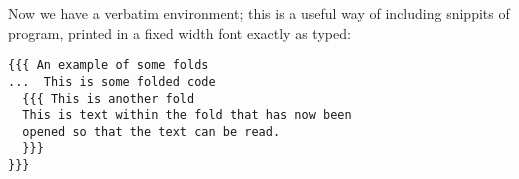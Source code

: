 Now we have a verbatim environment; this is a useful way of including
snippits of program, printed in a fixed width font exactly as typed:

\begin{verbatim}
{{{ An example of some folds
...  This is some folded code
  {{{ This is another fold
  This is text within the fold that has now been
  opened so that the text can be read.
  }}}
}}}
\end{verbatim}



